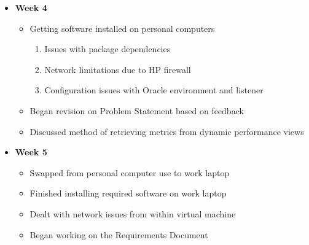 \documentclass[xcolor=dvipsnames]{beamer}
\begin{document}
\begin{frame}
\begin{itemize}
	\item \textbf{Week 4}
    \begin{itemize}
    	\item Getting software installed on personal computers
        \begin{enumerate}
        	\item Issues with package dependencies
            \item Network limitations due to HP firewall
            \item Configuration issues with Oracle environment and listener
        \end{enumerate}
        \item Began revision on Problem Statement based on feedback
        \item Discussed method of retrieving metrics from dynamic performance views
	\end{itemize}
\end{itemize}
\end{frame}

\begin{frame}
\begin{itemize}
	\item \textbf{Week 5}
    \begin{itemize}
    	\item Swapped from personal computer use to work laptop
        \item Finished installing required software on work laptop
        \item Dealt with network issues from within virtual machine
        \item Began working on the Requirements Document
	\end{itemize}
\end{itemize}
\end{frame}
\end{document}
